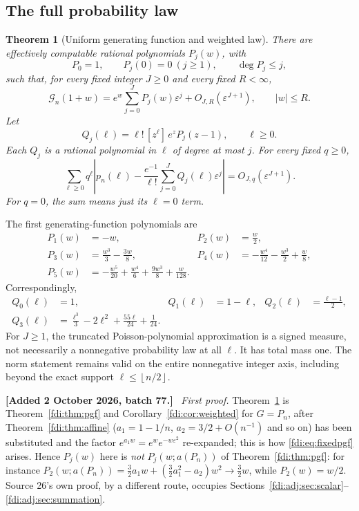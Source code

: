 \documentclass[11pt,letterpaper]{article}
\newtheorem{theorem}{Theorem}[section]
\theoremstyle{remark}\newtheorem{remark}[theorem]{Remark}
\newcommand{\eps}{\varepsilon}\newcommand{\Pois}{\operatorname{Poisson}}
\newcommand{\floor}[1]{\left\lfloor #1\right\rfloor}
\newenvironment{mergenote}[1][2 October 2026, batch 77]{\par\smallskip\begingroup\small\noindent\textbf{[Added #1.]}\ }{\endgroup\par\smallskip}
\begin{document}
\subsection{The full probability law}
\begin{theorem}[Uniform generating function and weighted law]\label{fdi:adj:thm:main}
There are effectively computable rational polynomials $P_j(w)$, with
\[
 P_0=1,\qquad P_j(0)=0\ (j\ge1),\qquad \deg P_j\le j,
\]
such that, for every fixed integer $J\ge0$ and every fixed $R<\infty$,
\begin{equation}\label{fdi:adj:eq:pgf}
 \mathcal G_n(1+w)=e^w\sum_{j=0}^J P_j(w)\eps^j+O_{J,R}(\eps^{J+1}),
 \qquad |w|\le R.
\end{equation}
Let
\begin{equation}\label{fdi:adj:eq:Qdef}
 Q_j(\ell)=\ell!\,[z^\ell]\,e^zP_j(z-1),\qquad \ell\ge0.
\end{equation}
Each $Q_j$ is a rational polynomial in $\ell$ of degree at most $j$. For every fixed $q\ge0$,
\begin{equation}\label{fdi:adj:eq:weighted}
 \sum_{\ell\ge0}q^\ell\left|p_n(\ell)
 -\frac{e^{-1}}{\ell!}\sum_{j=0}^J Q_j(\ell)\eps^j\right|
 =O_{J,q}(\eps^{J+1}).
\end{equation}
For $q=0$, the sum means just its $\ell=0$ term.
\end{theorem}
The first generating-function polynomials are
\begin{align*}
 P_1(w)&=-w,& P_2(w)&=\frac w2,\\
 P_3(w)&=\frac{w^3}{3}-\frac{3w}{8},&
 P_4(w)&=-\frac{w^4}{12}-\frac{w^3}{2}+\frac w8,\\
 P_5(w)&=-\frac{w^5}{20}+\frac{w^4}{6}+\frac{9w^3}{8}+\frac{w}{128}.
\end{align*}
Correspondingly,
\begin{align*}
 Q_0(\ell)&=1,& Q_1(\ell)&=1-\ell,& Q_2(\ell)&=\frac{\ell-1}{2},\\
 Q_3(\ell)&=\frac{\ell^3}{3}-2\ell^2+\frac{55\ell}{24}+\frac1{24}.
\end{align*}
For $J\ge1$, the truncated Poisson-polynomial approximation is a signed measure, not necessarily a nonnegative probability law at all $\ell$. It has total mass one. The norm statement remains valid on the entire nonnegative integer axis, including beyond the exact support $\ell\le\floor{n/2}$.

\begin{mergenote}
\emph{First proof.} Theorem~\ref{fdi:adj:thm:main} is Theorem~\ref{fdi:thm:pgf} and Corollary~\ref{fdi:cor:weighted} for $G=P_n$, after Theorem~\ref{fdi:thm:affine} ($a_1=1-1/n$, $a_2=3/2+O(n^{-1})$ and so on) has been substituted and the factor $e^{a_1w}=e^{w}e^{-w\eps^2}$ re-expanded; this is how \eqref{fdi:eq:fixedpgf} arises. Hence $P_j(w)$ here is \emph{not} $P_j(w;a(P_n))$ of Theorem~\ref{fdi:thm:pgf}: for instance $P_2(w;a(P_n))=\tfrac32a_1w+(\tfrac32a_1^2-a_2)w^2\to\tfrac32w$, while $P_2(w)=w/2$. Source 26's own proof, by a different route, occupies Sections~\ref{fdi:adj:sec:scalar}--\ref{fdi:adj:sec:summation}.
\end{mergenote}
\end{document}

